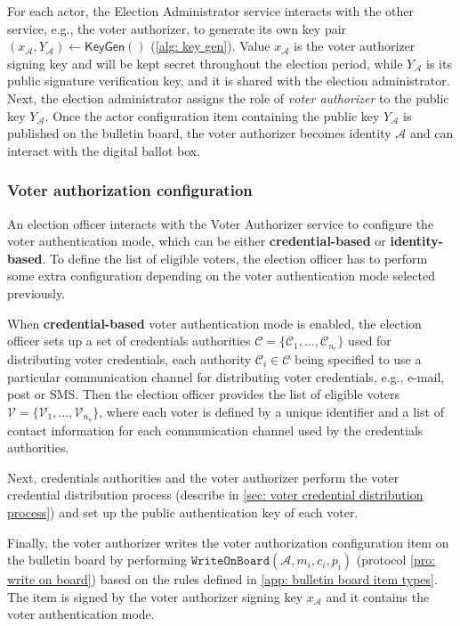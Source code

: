 For each actor, the Election Administrator service interacts with the other service, e.g., the voter authorizer, to generate its own key pair $(x_\mathcal{A}, Y_\mathcal{A}) \gets \mathsf{KeyGen}()$ (\cref{alg: key gen}). Value $x_\mathcal{A}$ is the voter authorizer signing key and will be kept secret throughout the election period, while $Y_\mathcal{A}$ is its public signature verification key, and it is shared with the election administrator. Next, the election administrator assigns the role of \textit{voter authorizer} to the public key $Y_\mathcal{A}$. Once the actor configuration item containing the public key $Y_\mathcal{A}$ is published on the bulletin board, the voter authorizer becomes identity $\mathcal{A}$ and can interact with the digital ballot box.


\subsubsection{Voter authorization configuration} \label{sec: voter authorization configuration}
An election officer interacts with the Voter Authorizer service to configure the voter authentication mode, which can be either \textbf{credential-based} or \textbf{identity-based}. To define the list of eligible voters, the election officer has to perform some extra configuration depending on the voter authentication mode selected previously.

When \textbf{credential-based} voter authentication mode is enabled, the election officer sets up a set of credentials authorities $\boldsymbol{\mathcal{C}} = \{ \mathcal{C}_1, ..., \mathcal{C}_{n_\mathrm{c}} \}$ used for distributing voter credentials, each authority $\mathcal{C}_i \in \boldsymbol{\mathcal{C}}$ being specified to use a particular communication channel for distributing voter credentials, e.g., e-mail, post or SMS. Then the election officer provides the list of eligible voters $\boldsymbol{\mathcal{V}} = \{ \mathcal{V}_1, ..., \mathcal{V}_{n_\mathrm{v}} \}$, where each voter is defined by a unique identifier and a list of contact information for each communication channel used by the credentials authorities.

Next, credentials authorities and the voter authorizer perform the voter credential distribution process (describe in \cref{sec: voter credential distribution process}) and set up the public authentication key of each voter.

Finally, the voter authorizer writes the voter authorization configuration item on the bulletin board by performing $\mathtt{WriteOnBoard}(\mathcal{A}, m_i, c_i, p_i)$ (protocol \ref{pro: write on board}) based on the rules defined in \cref{app: bulletin board item types}. The item is signed by the voter authorizer signing key $x_\mathcal{A}$ and it contains the voter authentication mode.

